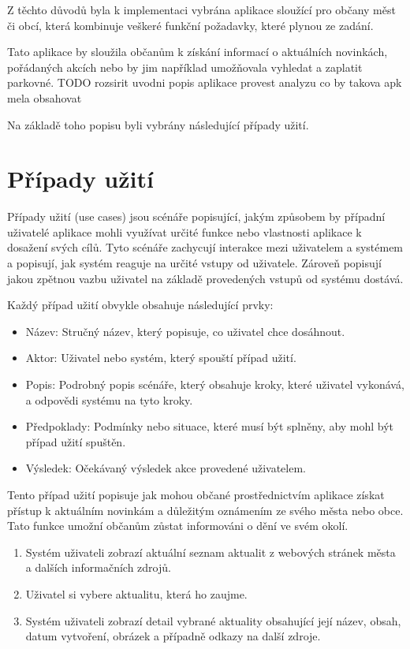Z těchto důvodů byla k implementaci vybrána aplikace sloužící pro občany měst či obcí, která kombinuje veškeré funkční požadavky, které plynou ze zadání.

Tato aplikace by sloužila občanům k získání informací o aktuálních novinkách, pořádaných akcích nebo by jim například umožňovala vyhledat a zaplatit parkovné.
TODO rozsirit uvodni popis aplikace provest analyzu co by takova apk mela obsahovat

Na základě toho popisu byli vybrány následující případy užití.

\section{Případy užití}
Případy užití (use cases) jsou scénáře popisující, jakým způsobem by případní uživatelé aplikace mohli využívat určité funkce nebo
vlastnosti aplikace k dosažení svých cílů. \cite{} Tyto scénáře zachycují interakce mezi uživatelem a systémem a popisují, jak systém reaguje na určité vstupy od 
uživatele. Zároveň popisují jakou zpětnou vazbu uživatel na základě provedených vstupů od systému dostává.

Každý případ užití obvykle obsahuje následující prvky:

\begin{itemize}
  \item Název: Stručný název, který popisuje, co uživatel chce dosáhnout.
  \item Aktor: Uživatel nebo systém, který spouští případ užití.
  \item Popis: Podrobný popis scénáře, který obsahuje kroky, které uživatel vykonává, a odpovědi systému na tyto kroky.
  \item Předpoklady: Podmínky nebo situace, které musí být splněny, aby mohl být případ užití spuštěn.
  \item Výsledek: Očekávaný výsledek akce provedené uživatelem.
\end{itemize}

Tento případ užití popisuje jak mohou občané prostřednictvím aplikace získat přístup k aktuálním novinkám a důležitým oznámením ze svého města 
nebo obce. Tato funkce umožní občanům zůstat informováni o dění ve svém okolí.

\begin{enumerate}
  \item Systém uživateli zobrazí aktuální seznam aktualit z webových stránek města a dalších informačních zdrojů.
  \item Uživatel si vybere aktualitu, která ho zaujme.
  \item Systém uživateli zobrazí detail vybrané aktuality obsahující její název, obsah, datum vytvoření, obrázek a případně odkazy na další zdroje.
\end{enumerate}

